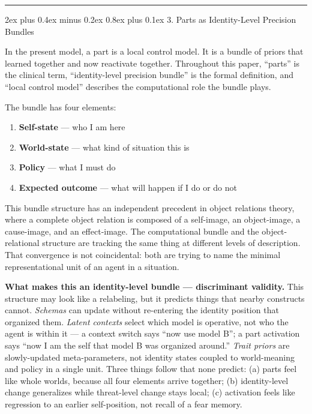 \documentclass[12pt,a4paper]{article}
\makeatletter
\newcounter{none}
\providecommand{\tightlist}{%
  \setlength{\itemsep}{0pt}\setlength{\parskip}{0pt}}
\renewcommand\subsection{\@startsection{subsection}{2}{0pt}%
  {2ex plus 0.4ex minus 0.2ex}%
  {0.8ex plus 0.1ex}%
  {\normalsize\itshape}}
\makeatother
\begin{document}
\begin{center}\rule{0.5\linewidth}{0.5pt}\end{center}

\subsection{3. Parts as Identity-Level Precision
Bundles}\label{parts-as-identity-level-precision-bundles}

In the present model, a part is a local control model. It is a bundle of
priors that learned together and now reactivate together. Throughout
this paper, ``parts'' is the clinical term, ``identity-level precision
bundle'' is the formal definition, and ``local control model'' describes
the computational role the bundle plays.

The bundle has four elements:

\begin{enumerate}
\def\labelenumi{\arabic{enumi}.}
\tightlist
\item
  \textbf{Self-state} --- who I am here
\item
  \textbf{World-state} --- what kind of situation this is
\item
  \textbf{Policy} --- what I must do
\item
  \textbf{Expected outcome} --- what will happen if I do or do not
\end{enumerate}

This bundle structure has an independent precedent in object relations
theory, where a complete object relation is composed of a self-image, an
object-image, a cause-image, and an effect-image. The computational
bundle and the object-relational structure are tracking the same thing
at different levels of description. That convergence is not
coincidental: both are trying to name the minimal representational unit
of an agent in a situation.

\textbf{What makes this an identity-level bundle --- discriminant
validity.} This structure may look like a relabeling, but it predicts
things that nearby constructs cannot. \emph{Schemas} can update without
re-entering the identity position that organized them. \emph{Latent
contexts} select which model is operative, not who the agent is within
it --- a context switch says ``now use model B''; a part activation says
``now I am the self that model B was organized around.'' \emph{Trait
priors} are slowly-updated meta-parameters, not identity states coupled
to world-meaning and policy in a single unit. Three things follow that
none predict: (a) parts feel like whole worlds, because all four
elements arrive together; (b) identity-level change generalizes while
threat-level change stays local; (c) activation feels like regression to
an earlier self-position, not recall of a fear memory.
\end{document}
